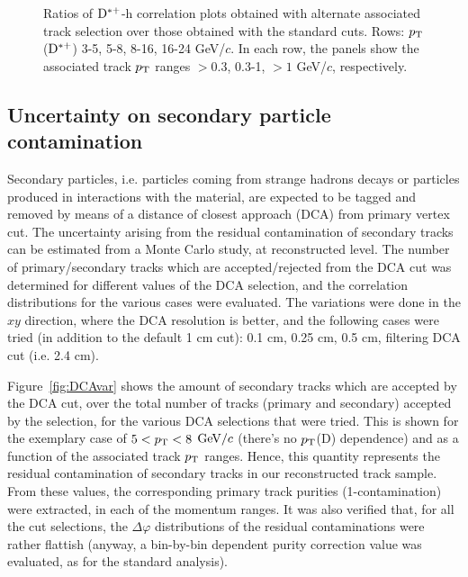 \begin{figure}
 \caption{Ratios of ${\rm D^{*+}}$-h correlation plots obtained with alternate associated track selection over those obtained with the standard cuts. Rows: $p_{\rm T}$(${\rm D^{*+}}$) 3-5, 5-8, 8-16, 16-24 GeV/$c$. In each row, the panels show the associated track
$p_{\rm T}$ ranges $> 0.3$, 0.3-1, $> 1$ GeV/$c$, respectively.}
\label{fig:SysTrEff_Dstar}
\end{figure}

\subsection{Uncertainty on secondary particle contamination}
Secondary particles, i.e. particles coming from strange hadrons decays or particles produced in interactions with the material, are expected to be tagged and removed by means of a distance of closest approach (DCA) from primary vertex cut. The uncertainty arising from the residual contamination of secondary tracks can be estimated from a Monte Carlo study, at reconstructed level. The number of primary/secondary tracks which are accepted/rejected from the DCA cut was determined for different values of the DCA selection, and the correlation distributions for the various cases were evaluated. The variations were done in the $xy$ direction, where the DCA resolution is better, and the following cases were tried (in addition to the default 1 cm cut): 0.1 cm, 0.25 cm, 0.5 cm, filtering DCA cut (i.e. 2.4 cm).

Figure~\ref{fig:DCAvar} shows the amount of secondary tracks which are accepted by the DCA cut, over the total number of tracks (primary and secondary) accepted by the selection, for the various DCA selections that were tried. This is shown for the exemplary case of $5 < p_{\rm T} < 8$ $\mathrm{GeV}/c$ (there's no $p_{\rm T}$(D) dependence) and as a function of the associated track $p_{\rm T}$ ranges. Hence, this quantity represents the residual contamination of secondary tracks in our reconstructed track sample. From these values, the corresponding primary track purities (1-contamination) were extracted, in each of the momentum ranges.
It was also verified that, for all the cut selections, the $\Delta\varphi$ distributions of the residual contaminations were rather flattish (anyway, a bin-by-bin dependent purity correction value was evaluated, as for the standard analysis).

